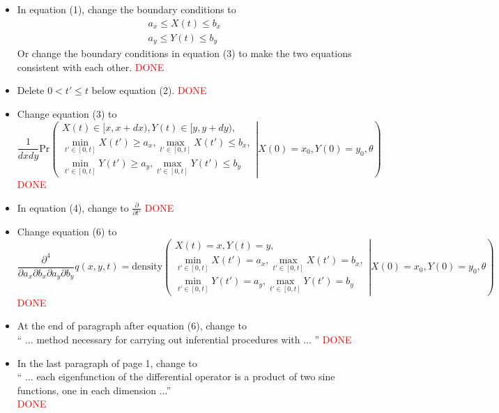 \documentclass[12pt]{article}
\begin{document}
\begin{itemize}

\item In equation (1), change the boundary conditions to 
$$ \begin{array}{cc}
a_x \le X(t) \le b_x \\
a_y \le Y(t) \le b_y
\end{array}$$
Or change the boundary conditions in equation (3) to make the two equations 
consistent with each other. \textcolor{red}{DONE}

\item Delete $0 < t' \le t$ below equation (2). \textcolor{red}{DONE}

\item Change equation (3) to 
$$\frac{1}{dx dy} \mbox{Pr}\left( \left. \begin{array}{ll}
X(t) \in [x, x+dx), Y(t) \in [y, y+dy),  \\
\displaystyle \min_{t'\in[0, t]} X(t') \ge a_x, \max_{t'\in[0, t]} X(t') \le b_x, \\
\displaystyle \min_{t'\in[0, t]} Y(t') \ge a_y, \max_{t'\in[0, t]} Y(t') \le b_y
\end{array} \right | X(0)=x_0, Y(0)=y_0, \theta
\right) $$ \textcolor{red}{DONE}

\item In equation (4), change to $\displaystyle \frac{\partial}{\partial t'} $  \textcolor{red}{DONE}

\item Change equation (6) to 
$$ \frac{\partial^4}{\partial a_x \partial b_x \partial a_y \partial b_y} q(x,y,t) = 
\mbox{density} \left( \left. \begin{array}{ll}
X(t) =x, Y(t) =y,  \\
\displaystyle \min_{t'\in[0, t]} X(t') = a_x, \max_{t'\in[0, t]} X(t') = b_x, \\
\displaystyle \min_{t'\in[0, t]} Y(t') = a_y, \max_{t'\in[0, t]} Y(t') = b_y
\end{array} \right | X(0)=x_0, Y(0)=y_0, \theta
\right) $$ \textcolor{red}{DONE}

\item At the end of paragraph after equation (6), change to \\
  `` ... method necessary for carrying out inferential procedures with ... ''
  \textcolor{red}{DONE}

\item In the last paragraph of page 1, change to \\
  `` ... each eigenfunction of the differential operator is a product of two sine functions, one in each dimension ...'' \\
  \textcolor{red}{DONE}


\end{itemize}
\end{document}

